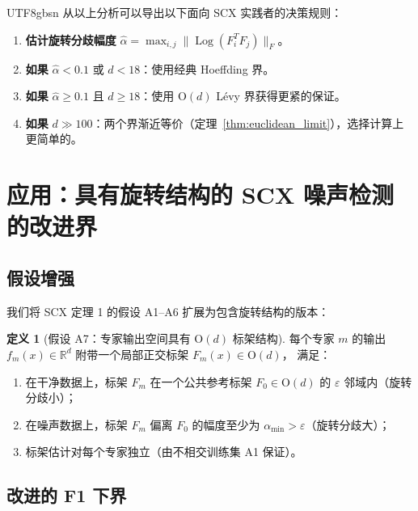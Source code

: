 \documentclass[12pt,a4paper]{article}
\theoremstyle{plain}
\theoremstyle{definition}
\newtheorem{definition}[theorem]{定义}
\theoremstyle{remark}
\newcommand{\R}{\mathbb{R}}
\newcommand{\Od}{\mathrm{O}(d)}
\DeclareMathOperator{\Log}{Log}
\begin{document}
\begin{CJK}{UTF8}{gbsn}
从以上分析可以导出以下面向 SCX 实践者的决策规则：

\begin{enumerate}[label=\textbf{规则 \arabic*:}, leftmargin=*]
    \item \textbf{估计旋转分歧幅度} $\hat{\alpha} = \max_{i,j} \|\Log(F_i^T F_j)\|_F$。
    \item \textbf{如果} $\hat{\alpha} < 0.1$ 或 $d < 18$：使用经典 Hoeffding 界。
    \item \textbf{如果} $\hat{\alpha} \geq 0.1$ 且 $d \geq 18$：使用 $\Od$ Lévy 界获得更紧的保证。
    \item \textbf{如果} $d \gg 100$：两个界渐近等价（定理~\ref{thm:euclidean_limit}），选择计算上更简单的。
\end{enumerate}

\newpage

\section{应用：具有旋转结构的 SCX 噪声检测的改进界}

\subsection{假设增强}

我们将 SCX 定理 1 的假设 A1--A6 扩展为包含旋转结构的版本：

\begin{definition}[假设 A7：专家输出空间具有 $\Od$ 标架结构]\label{ass:A7}
每个专家 $m$ 的输出 $f_m(x) \in \R^d$ 附带一个局部正交标架 $F_m(x) \in \Od$，
满足：
\begin{enumerate}[label=(\roman*)]
    \item 在干净数据上，标架 $F_m$ 在一个公共参考标架 $F_0 \in \Od$ 的 $\varepsilon$ 邻域内（旋转分歧小）；
    \item 在噪声数据上，标架 $F_m$ 偏离 $F_0$ 的幅度至少为 $\alpha_{\min} > \varepsilon$（旋转分歧大）；
    \item 标架估计对每个专家独立（由不相交训练集 A1 保证）。
\end{enumerate}
\end{definition}

\subsection{改进的 F1 下界}


\end{CJK}
\end{document}
